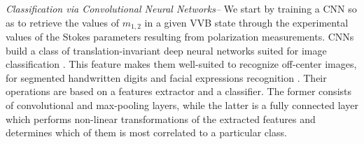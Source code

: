 

\textit{Classification via Convolutional Neural Networks--} We start by training a \ac{CNN} so as to retrieve the values of $m_{1,2}$ in a given VVB state through the experimental values of the Stokes parameters resulting from polarization measurements.  \acp{CNN} build a class of translation-invariant deep neural networks suited for image classification
. This feature makes them well-suited to recognize off-center images, 
 for segmented handwritten digits \cite{Simard2003,Ciresan:2011:FHP:2283516.2283603} 
 and facial expressions recognition \cite{MATSUGU2003555}. 
 Their operations are based on a features extractor and a classifier. The former consists of convolutional and max-pooling layers, while the latter is a fully connected layer which performs non-linear transformations of the extracted features and determines which of them is most correlated to a particular class.
 
